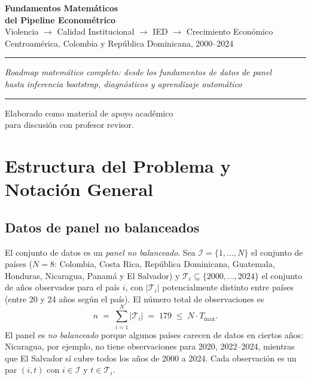 \documentclass[12pt, a4paper]{article}
\theoremstyle{definition}
\begin{document}

\begin{titlepage}
\centering
\vspace*{3cm}
{\Huge\bfseries\color{deepblue}
Fundamentos Matemáticos\\[0.4em]
del Pipeline Econométrico}\\[1.5em]
{\large\color{darkgrey}
Violencia $\longrightarrow$ Calidad Institucional $\longrightarrow$ IED $\longrightarrow$ Crecimiento Económico\\[0.5em]
Centroamérica, Colombia y República Dominicana, 2000--2024}\\[3em]
\hrule\vspace{1em}
{\normalsize
\textit{Roadmap matemático completo: desde los fundamentos de datos de panel}\\
\textit{hasta inferencia bootstrap, diagnósticos y aprendizaje automático}}
\vspace{1em}\hrule
\vfill
{\small Elaborado como material de apoyo académico\\
para discusión con profesor revisor.}
\end{titlepage}

\tableofcontents
\newpage

\section{Estructura del Problema y Notación General}

\subsection{Datos de panel no balanceados}

El conjunto de datos es un \emph{panel no balanceado}. Sea $\mathcal{I} = \{1,\ldots,N\}$ el conjunto de países ($N=8$: Colombia, Costa Rica, República Dominicana, Guatemala, Honduras, Nicaragua, Panamá y El Salvador) y $\mathcal{T}_i \subseteq \{2000,\ldots,2024\}$ el conjunto de años observados para el país $i$, con $|\mathcal{T}_i|$ potencialmente distinto entre países (entre 20 y 24 años según el país). El número total de observaciones es
\[
  n \;=\; \sum_{i=1}^{N} |\mathcal{T}_i| \;=\; 179 \;\leq\; N \cdot T_{\max}.
\]
El panel es \emph{no balanceado} porque algunos países carecen de datos en ciertos años: Nicaragua, por ejemplo, no tiene observaciones para 2020, 2022--2024, mientras que El Salvador sí cubre todos los años de 2000 a 2024. Cada observación es un par $(i,t)$ con $i \in \mathcal{I}$ y $t \in \mathcal{T}_i$.
\end{document}
